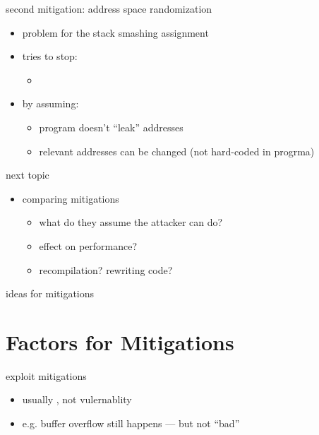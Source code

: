 \begin{frame}{second mitigation: address space randomization}
    \begin{itemize}
    \item problem for the stack smashing assignment
    \item tries to stop:
        \begin{itemize}
        \item {} \\
        \end{itemize}
    \item by assuming:
        \begin{itemize}
        \item program doesn't ``leak'' addresses
        \item relevant addresses can be changed (not hard-coded in progrma)
        \end{itemize}
    \end{itemize}
\end{frame}

\begin{frame}{next topic}
    \begin{itemize}
    \item comparing mitigations
        \begin{itemize}
        \item what do they assume the attacker can do?
        \item effect on performance?
        \item recompilation? rewriting code?
        \end{itemize}
    \end{itemize}
\end{frame}

\begin{frame}{ideas for mitigations}
\end{frame}

\section{Factors for Mitigations}

\begin{frame}{exploit mitigations}
    \begin{itemize}
    \item usually , not vulernablity
    \item e.g. buffer overflow still happens --- but not ``bad''
    \end{itemize}
\end{frame}

